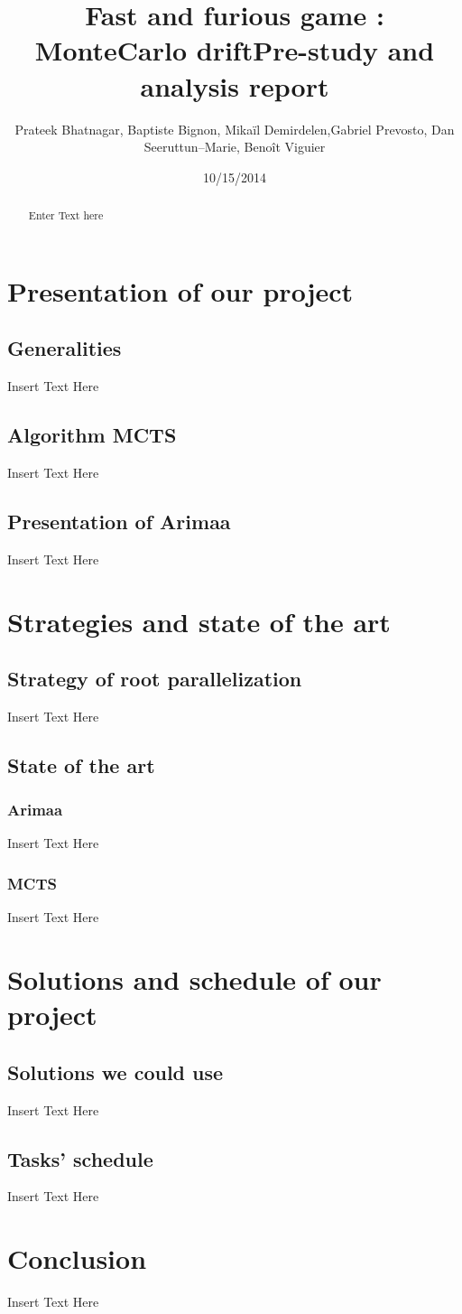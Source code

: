 \documentclass[12pt]{article}
\title{Fast and furious game : MonteCarlo drift\smallbreak Pre-study and analysis report}
\author{Prateek Bhatnagar, Baptiste Bignon, Mikaïl Demirdelen,\endline Gabriel Prevosto, Dan Seeruttun--Marie,  Benoît Viguier}
\date{10/15/2014}
\begin{document}
\maketitle
\begin{abstract}
Enter Text here
\end{abstract}


\newpage
\tableofcontents
\newpage

\section{Presentation of our project}
\subsection{Generalities}
Insert Text Here
\subsection{Algorithm MCTS}
Insert Text Here
\subsection{Presentation of Arimaa}
Insert Text Here

\newpage
\section{Strategies and state of the art}
\subsection{Strategy of root parallelization}
Insert Text Here
\subsection{State of the art}
\subsubsection{Arimaa}
Insert Text Here
\subsubsection{MCTS}
Insert Text Here

\newpage
\section{Solutions and schedule of our project}
\subsection{Solutions we could use}
Insert Text Here
\subsection {Tasks' schedule}
Insert Text Here
\newpage
\section{Conclusion}
Insert Text Here
\end{document}
